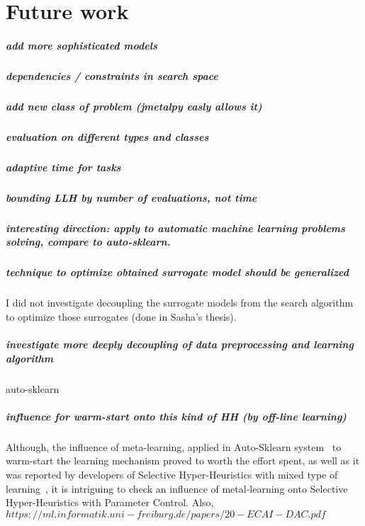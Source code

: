\chapter{Future work}
\paragraph{add more sophisticated models}
\paragraph{dependencies / constraints in search space}
\paragraph{add new class of problem (jmetalpy easly allows it)}
\paragraph{evaluation on different types and classes}
\paragraph{adaptive time for tasks}
\paragraph{bounding LLH by number of evaluations, not time}
\paragraph{interesting direction: apply to automatic machine learning problems solving, compare to auto-sklearn.}
\paragraph{technique to optimize obtained surrogate model should be generalized}
I did not investigate decoupling the surrogate models from the search algorithm to optimize those surrogates (done in Sasha's thesis).

\paragraph{investigate more deeply decoupling of data preprocessing and learning algorithm} auto-sklearn
\paragraph{influence for warm-start onto this kind of HH (by off-line learning)}
Although, the influence of meta-learning, applied in Auto-Sklearn system~\cite{feurer2015efficient} to warm-start the learning mechanism proved to worth the effort spent, as well as it was reported by developers of Selective Hyper-Heuristics with mixed type of learning~\cite{uludaug2013hybrid,}, it is intriguing to check an influence of metal-learning onto Selective Hyper-Heuristics with Parameter Control.
Also, $https://ml.informatik.uni-freiburg.de/papers/20-ECAI-DAC.pdf$

